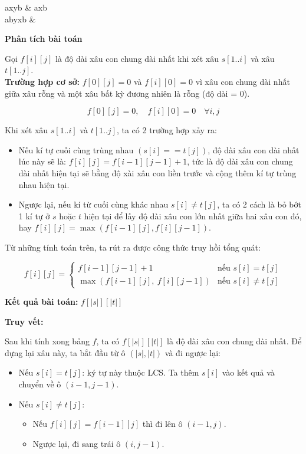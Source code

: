 \begin{sampleio}
axyb & axb\\ 
abyxb &  \\ 
\end{sampleio}

\textbf{Phân tích bài toán}

Gọi \(f[i][j]\) là độ dài xâu con chung dài nhất khi xét xâu $s[1..i]$ và xâu $t[1..j]$.\\

\textbf{Trường hợp cơ sở:} \(f[0][j] = 0\) và \(f[i][0] = 0\) vì xâu con chung dài nhất giữa xâu rỗng và một xâu bất kỳ đương nhiên là rỗng (độ dài = 0).

\[
f[0][j] = 0, \quad f[i][0] = 0 \quad \forall i,j
\]

Khi xét xâu $s[1..i]$ và $t[1..j]$, ta có 2 trường hợp xảy ra:
\begin{itemize}
    \item Nếu kí tự cuối cùng trùng nhau $(s[i] == t[j])$, độ dài xâu con dài nhất lúc này sẽ là: $f[i][j] = f[i - 1][j - 1] + 1$, tức là độ dài xâu con chung dài nhất hiện tại sẽ bằng độ xài xâu con liền trước và cộng thêm kí tự trùng nhau hiện tại.
    \item Ngược lại, nếu kí từ cuối cùng khác nhau $s[i] \neq t[j]$, ta có 2 cách là bỏ bớt 1 kí tự ở $s$ hoặc $t$ hiện tại để lấy độ dài xâu con lớn nhất giữa hai xâu con đó, hay $f[i][j] = \max (f[i - 1][j], f[i][j - 1])$.
\end{itemize}

Từ những tính toán trên, ta rút ra được công thức truy hồi tổng quát:

\[
f[i][j] =
\begin{cases}
    f[i - 1][j - 1] + 1 & \text{nếu } s[i] = t[j] \\
    \max(f[i - 1][j],\ f[i][j - 1]) & \text{nếu } s[i] \neq t[j]
\end{cases}
\]

\textbf{Kết quả bài toán:} $f[|s|][|t|]$

\textbf{Truy vết:}

Sau khi tính xong bảng $f$, ta có $f[|s|][|t|]$ là độ dài xâu con chung dài nhất.  
Để dựng lại xâu này, ta bắt đầu từ ô $(|s|, |t|)$ và đi ngược lại:

\begin{itemize}
    \item Nếu $s[i] = t[j]$: ký tự này thuộc LCS.  
    Ta thêm $s[i]$ vào kết quả và chuyển về ô $(i-1, j-1)$.
    \item Nếu $s[i] \neq t[j]$:  
    \begin{itemize}
        \item Nếu $f[i][j] = f[i-1][j]$ thì đi lên ô $(i-1, j)$.
        \item Ngược lại, đi sang trái ô $(i, j-1)$.
    \end{itemize}
\end{itemize}

